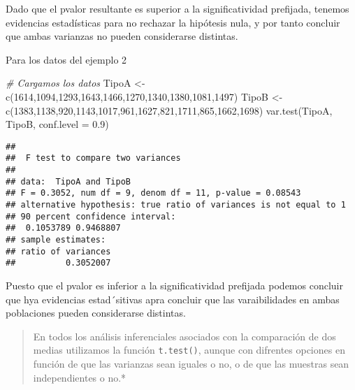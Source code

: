 \documentclass[
]{book}
\newenvironment{Shaded}{\begin{snugshade}}{\end{snugshade}}
\newcommand{\AttributeTok}[1]{\textcolor[rgb]{0.77,0.63,0.00}{#1}}
\newcommand{\CommentTok}[1]{\textcolor[rgb]{0.56,0.35,0.01}{\textit{#1}}}
\newcommand{\DecValTok}[1]{\textcolor[rgb]{0.00,0.00,0.81}{#1}}
\newcommand{\FloatTok}[1]{\textcolor[rgb]{0.00,0.00,0.81}{#1}}
\newcommand{\FunctionTok}[1]{\textcolor[rgb]{0.00,0.00,0.00}{#1}}
\newcommand{\NormalTok}[1]{#1}
\newcommand{\OtherTok}[1]{\textcolor[rgb]{0.56,0.35,0.01}{#1}}
\begin{document}
Dado que el pvalor resultante es superior a la significatividad prefijada, tenemos evidencias estadísticas para no rechazar la hipótesis nula, y por tanto concluir que ambas varianzas no pueden considerarse distintas.

Para los datos del ejemplo 2

\begin{Shaded}
\begin{Highlighting}[]
\CommentTok{\# Cargamos los datos}
\NormalTok{TipoA }\OtherTok{\textless{}{-}} \FunctionTok{c}\NormalTok{(}\DecValTok{1614}\NormalTok{,}\DecValTok{1094}\NormalTok{,}\DecValTok{1293}\NormalTok{,}\DecValTok{1643}\NormalTok{,}\DecValTok{1466}\NormalTok{,}\DecValTok{1270}\NormalTok{,}\DecValTok{1340}\NormalTok{,}\DecValTok{1380}\NormalTok{,}\DecValTok{1081}\NormalTok{,}\DecValTok{1497}\NormalTok{)}
\NormalTok{TipoB }\OtherTok{\textless{}{-}} \FunctionTok{c}\NormalTok{(}\DecValTok{1383}\NormalTok{,}\DecValTok{1138}\NormalTok{,}\DecValTok{920}\NormalTok{,}\DecValTok{1143}\NormalTok{,}\DecValTok{1017}\NormalTok{,}\DecValTok{961}\NormalTok{,}\DecValTok{1627}\NormalTok{,}\DecValTok{821}\NormalTok{,}\DecValTok{1711}\NormalTok{,}\DecValTok{865}\NormalTok{,}\DecValTok{1662}\NormalTok{,}\DecValTok{1698}\NormalTok{)}
\FunctionTok{var.test}\NormalTok{(TipoA, TipoB, }\AttributeTok{conf.level =} \FloatTok{0.9}\NormalTok{)}
\end{Highlighting}
\end{Shaded}

\begin{verbatim}
## 
##  F test to compare two variances
## 
## data:  TipoA and TipoB
## F = 0.3052, num df = 9, denom df = 11, p-value = 0.08543
## alternative hypothesis: true ratio of variances is not equal to 1
## 90 percent confidence interval:
##  0.1053789 0.9468807
## sample estimates:
## ratio of variances 
##          0.3052007
\end{verbatim}

Puesto que el pvalor es inferior a la significatividad prefijada podemos concluir que hya evidencias estad´sitivas apra concluir que las varaibilidades en ambas poblaciones pueden considerarse distintas.

\begin{quote}
En todos los análisis inferenciales asociados con la comparación de dos medias utilizamos la función \texttt{t.test()}, aunque con difrentes opciones en función de que las varianzas sean iguales o no, o de que las muestras sean independientes o no.*
\end{quote}
\end{document}
